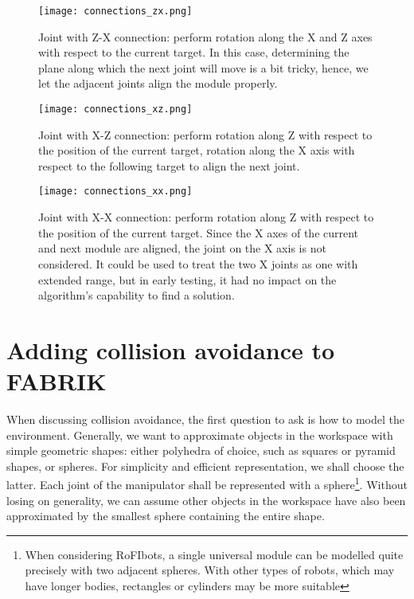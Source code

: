 \begin{figure}[h]
  \centering
  \texttt{[image: connections\_zx.png]}
  \caption{Joint with Z-X connection: perform rotation along the X and Z axes with respect to the current target. In this case, determining the plane along which the next joint will move is a bit tricky, hence, we let the adjacent joints align the module properly.}
\end{figure}

\begin{figure}[h]
  \centering
  \texttt{[image: connections\_xz.png]}
  \caption{Joint with X-Z connection: perform rotation along Z with respect to the position of the current target, rotation along the X axis with respect to the following target to align the next joint.}
\end{figure}

\begin{figure}[h]
  \centering
  \texttt{[image: connections\_xx.png]}
  \caption{Joint with X-X connection: perform rotation along Z with respect to the position of the current target. Since the X axes of the current and next module are aligned, the joint on the X axis is not considered. It could be used to treat the two X joints as one with extended range, but in early testing, it had no impact on the algorithm's capability to find a solution.}
\end{figure}

\clearpage

\section{Adding collision avoidance to FABRIK}

When discussing collision avoidance, the first question to ask is how to model the environment. Generally, we want to approximate objects in the workspace with simple geometric shapes: either polyhedra of choice, such as squares or pyramid shapes, or spheres. For simplicity and efficient representation, we shall choose the latter. Each joint of the manipulator shall be represented with a sphere\footnote{When considering RoFIbots, a single universal module can be modelled quite precisely with two adjacent spheres. With other types of robots, which may have longer bodies, rectangles or cylinders may be more suitable}. Without losing on generality, we can assume other objects in the workspace have also been approximated by the smallest sphere containing the entire shape.

